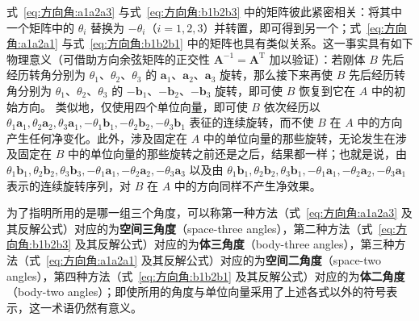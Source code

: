 式~\eqref{eq:方向角:a1a2a3} 与式~\eqref{eq:方向角:b1b2b3} 中的矩阵彼此紧密相关：将其中一个矩阵中的 $\theta_i$ 替换为 $-\theta_i$（$i=1,2,3$）并转置，即可得到另一个；式~\eqref{eq:方向角:a1a2a1} 与式~\eqref{eq:方向角:b1b2b1} 中的矩阵也具有类似关系。这一事实具有如下物理意义（可借助方向余弦矩阵的正交性 $\bm{A}^{-1}=\bm{A}^{\mathrm{T}}$ 加以验证）：若刚体 $B$ 先后经历转角分别为 $\theta_1$、$\theta_2$、$\theta_3$ 的 $\mathbf{a}_1$、$\mathbf{a}_2$、$\mathbf{a}_3$ 旋转，那么接下来再使 $B$ 先后经历转角分别为 $\theta_1$、$\theta_2$、$\theta_3$ 的 $-\mathbf{b}_1$、$-\mathbf{b}_2$、$-\mathbf{b}_3$ 旋转，即可使 $B$ 恢复到它在 $A$ 中的初始方向。
\blocksep
类似地，仅使用四个单位向量，即可使 $B$ 依次经历以 $\theta_1\mathbf{a}_1,\theta_2\mathbf{a}_2,\theta_3\mathbf{a}_1,-\theta_1\mathbf{b}_1,-\theta_2\mathbf{b}_2,-\theta_3\mathbf{b}_1$ 表征的连续旋转，而不使 $B$ 在 $A$ 中的方向产生任何净变化。此外，涉及固定在 $A$ 中的单位向量的那些旋转，无论发生在涉及固定在 $B$ 中的单位向量的那些旋转之前还是之后，结果都一样；也就是说，由 $\theta_1\mathbf{b}_1,\theta_2\mathbf{b}_2,\theta_3\mathbf{b}_3,-\theta_1\mathbf{a}_1,-\theta_2\mathbf{a}_2,-\theta_3\mathbf{a}_3$ 以及由 $\theta_1\mathbf{b}_1,\theta_2\mathbf{b}_2,\theta_3\mathbf{b}_1,-\theta_1\mathbf{a}_1,-\theta_2\mathbf{a}_2,-\theta_3\mathbf{a}_1$ 表示的连续旋转序列，对 $B$ 在 $A$ 中的方向同样不产生净效果。

为了指明所用的是哪一组三个角度，可以称第一种方法（式~\eqref{eq:方向角:a1a2a3} 及其反解公式）对应的为\textbf{空间三角度}（space-three angles），第二种方法（式~\eqref{eq:方向角:b1b2b3} 及其反解公式）对应的为\textbf{体三角度}（body-three angles），第三种方法（式~\eqref{eq:方向角:a1a2a1} 及其反解公式）对应的为\textbf{空间二角度}（space-two angles），第四种方法（式~\eqref{eq:方向角:b1b2b1} 及其反解公式）对应的为\textbf{体二角度}（body-two angles）；即使所用的角度与单位向量采用了上述各式以外的符号表示，这一术语仍然有意义。

